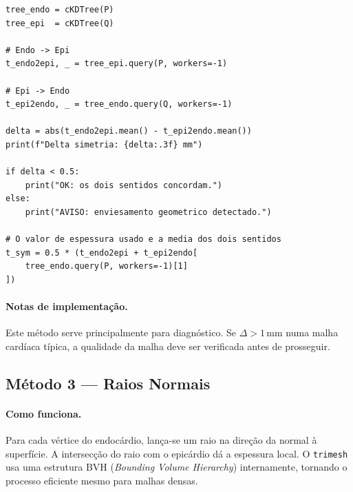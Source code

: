 \begin{lstlisting}
tree_endo = cKDTree(P)
tree_epi  = cKDTree(Q)

# Endo -> Epi
t_endo2epi, _ = tree_epi.query(P, workers=-1)

# Epi -> Endo
t_epi2endo, _ = tree_endo.query(Q, workers=-1)

delta = abs(t_endo2epi.mean() - t_epi2endo.mean())
print(f"Delta simetria: {delta:.3f} mm")

if delta < 0.5:
    print("OK: os dois sentidos concordam.")
else:
    print("AVISO: enviesamento geometrico detectado.")

# O valor de espessura usado e a media dos dois sentidos
t_sym = 0.5 * (t_endo2epi + t_epi2endo[
    tree_endo.query(P, workers=-1)[1]
])
\end{lstlisting}

\paragraph{Notas de implementação.}
Este método serve principalmente para diagnóstico.
Se $\Delta > 1$\,mm numa malha cardíaca típica, a qualidade
da malha deve ser verificada antes de prosseguir.

\subsection{Método 3 --- Raios Normais}
\label{impl:rays}

\paragraph{Como funciona.}
Para cada vértice do endocárdio, lança-se um raio na direção
da normal à superfície. A intersecção do raio com o epicárdio
dá a espessura local. O \texttt{trimesh} usa uma estrutura BVH
(\emph{Bounding Volume Hierarchy}) internamente, tornando o
processo eficiente mesmo para malhas densas.

